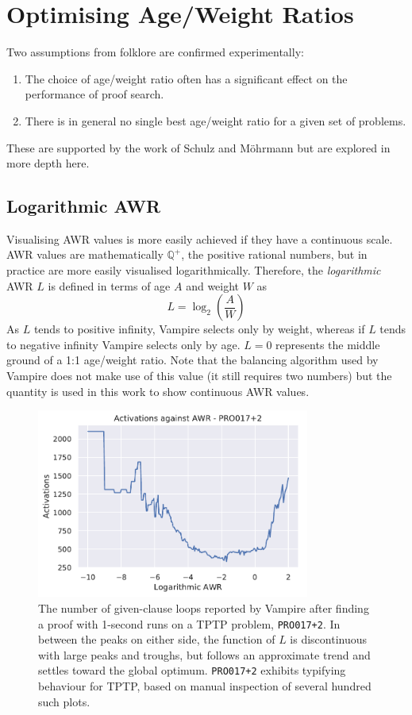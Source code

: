 \documentclass{llncs}
\newcommand{\sandm}{Schulz and M{\"{o}}hrmann}
\begin{document}
\section{Optimising Age/Weight Ratios}
\label{sec:awr:study}
Two assumptions from folklore are confirmed experimentally:
\begin{enumerate}
	\item The choice of age/weight ratio often has a significant effect on the performance of proof search.
	\item There is in general no single best age/weight ratio for a given set of problems.
\end{enumerate}
These are supported by the work of \sandm{} but are explored in more depth here.

\subsection{Logarithmic AWR}
Visualising AWR values is more easily achieved if they have a continuous scale.
AWR values are mathematically \(\mathbb{Q}^{+}\), the positive rational numbers, but in practice are more easily visualised logarithmically.
Therefore, the \emph{logarithmic} AWR \(L\) is defined in terms of age \(A\) and weight \(W\) as
\[
	L = \log_2{\left(\frac{A}{W}\right)}
\]
As \(L\) tends to positive infinity, Vampire selects only by weight, whereas if \(L\) tends to negative infinity Vampire selects only by age.
\(L = 0\) represents the middle ground of a 1:1 age/weight ratio.
Note that the balancing algorithm used by Vampire does not make use of this value (it still requires two numbers) but the quantity is used in this work to show continuous AWR values.

\begin{figure}[t]
	\centering
	\includegraphics[width=0.8\textwidth]{example-optimal-awr}
	\caption{
		The number of given-clause loops reported by Vampire after finding a proof with 1-second runs on a TPTP problem, \texttt{PRO017+2}.
In between the peaks on either side, the function of \(L\) is discontinuous with large peaks and troughs, but follows an approximate trend and settles toward the global optimum.
\texttt{PRO017+2} exhibits typifying behaviour for TPTP, based on manual inspection of several hundred such plots.
}
	\label{fig:example-optimal-awr}
\end{figure}
\end{document}
